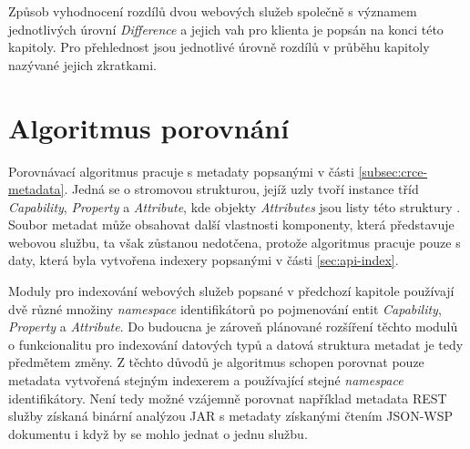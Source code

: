 \documentclass[czech,DP]{thesiskiv}
\begin{document}
Způsob vyhodnocení rozdílů dvou webových služeb společně s významem jednotlivých úrovní \textit{Difference} a jejich vah pro klienta je popsán na konci této kapitoly. Pro přehlednost jsou jednotlivé úrovně rozdílů v průběhu kapitoly nazývané jejich zkratkami. 



\section{Algoritmus porovnání}
\label{sec:cmp-alg}

Porovnávací algoritmus pracuje s metadaty popsanými v části \ref{subsec:crce-metadata}. Jedná se o stromovou strukturou, jejíž uzly tvoří instance tříd \textit{Capability}, \textit{Property} a \textit{Attribute}, kde objekty \textit{Attributes} jsou listy této struktury . Soubor metadat může obsahovat další vlastnosti komponenty, která představuje webovou službu, ta však zůstanou nedotčena, protože algoritmus pracuje pouze s daty, která byla vytvořena indexery popsanými v části \ref{sec:api-index}.

Moduly pro indexování webových služeb popsané v předchozí kapitole používají dvě různé množiny \textit{namespace} identifikátorů po pojmenování entit \textit{Capability}, \textit{Property} a \textit{Attribute}. Do budoucna je zároveň plánované rozšíření těchto modulů o funkcionalitu pro indexování datových typů a datová struktura metadat je tedy předmětem změny. Z těchto důvodů je algoritmus schopen porovnat pouze metadata vytvořená stejným indexerem a používající stejné \textit{namespace} identifikátory. Není tedy možné vzájemně porovnat například metadata REST služby získaná binární analýzou JAR s metadaty získanými čtením JSON-WSP dokumentu i když by se mohlo jednat o jednu službu.
\end{document}
